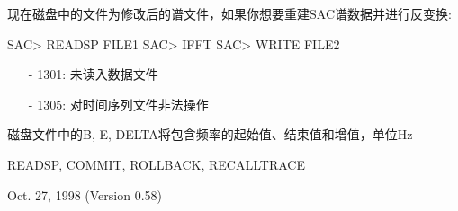现在磁盘中的文件为修改后的谱文件，如果你想要重建SAC谱数据并进行反变换:
\begin{SACCode}
SAC> READSP FILE1
SAC> IFFT
SAC> WRITE FILE2
\end{SACCode}

\begin{itemize}
\item[-]1301: 未读入数据文件
\item[-]1305: 对时间序列文件非法操作
\end{itemize}

磁盘文件中的B, E, DELTA将包含频率的起始值、结束值和增值，单位Hz

READSP, COMMIT, ROLLBACK, RECALLTRACE

Oct. 27, 1998 (Version 0.58)
